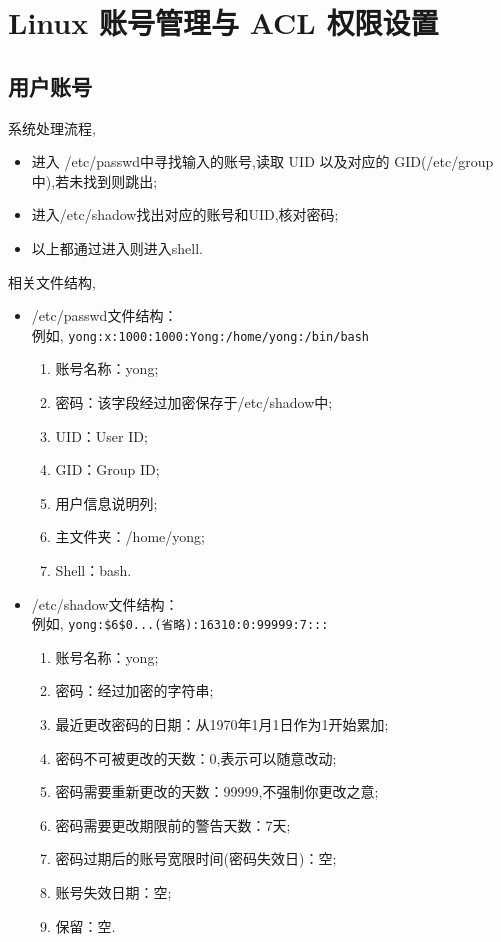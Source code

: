 \section{Linux 账号管理与 ACL 权限设置}

\subsection{用户账号}
系统处理流程,
\begin{itemize}
    \item 进入 /etc/passwd中寻找输入的账号,读取 UID 以及对应的 GID(/etc/group%
    中),若未找到则跳出;

    \item 进入/etc/shadow找出对应的账号和UID,核对密码;

    \item 以上都通过进入则进入shell.
\end{itemize}

相关文件结构,
\begin{itemize}
    \item /etc/passwd文件结构：\\
    例如, \verb|yong:x:1000:1000:Yong:/home/yong:/bin/bash|
    \begin{enumerate}
        \item 账号名称：yong;
        \item 密码：该字段经过加密保存于/etc/shadow中;
        \item UID：User ID;
        \item GID：Group ID;
        \item 用户信息说明列;
        \item 主文件夹：/home/yong;
        \item Shell：bash.
    \end{enumerate}

    \item /etc/shadow文件结构：\\
    例如, \verb|yong:$6$0...(省略):16310:0:99999:7:::|
    \begin{enumerate}
        \item 账号名称：yong;
        \item 密码：经过加密的字符串;
        \item 最近更改密码的日期：从1970年1月1日作为1开始累加;
        \item 密码不可被更改的天数：0,表示可以随意改动;
        \item 密码需要重新更改的天数：99999,不强制你更改之意;
        \item 密码需要更改期限前的警告天数：7天;
        \item 密码过期后的账号宽限时间(密码失效日)：空;
        \item 账号失效日期：空;
        \item 保留：空.
    \end{enumerate}
\end{itemize}


